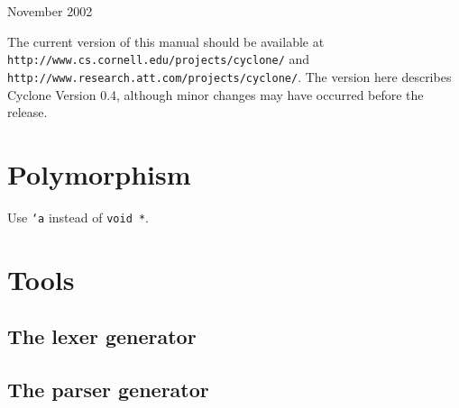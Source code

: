 \bigskip

\begin{center}
{\Large November 2002}
\end{center}

\bigskip

The current version of this manual should be available at\\
\texttt{http://www.cs.cornell.edu/projects/cyclone/} and\\
\texttt{http://www.research.att.com/projects/cyclone/}.  The version
here describes Cyclone Version 0.4, although minor changes may have
occurred before the release.

\newpage

\tableofcontents
\newpage

\section{Polymorphism}
\hypertarget{polymorphism}{}

Use \texttt{`a} instead of \texttt{void *}.


\appendix





\section{Tools}

\subsection{The lexer generator}
\subsection{The parser generator}



\printindex



